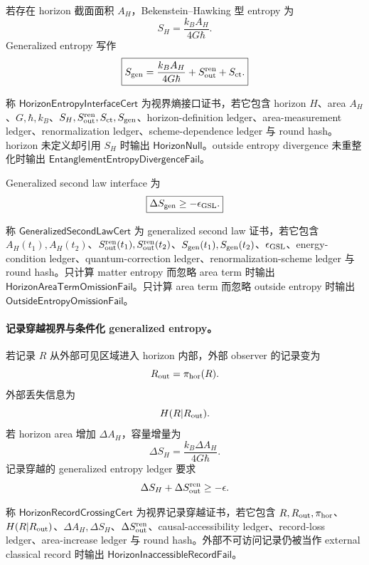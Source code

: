 若存在 horizon 截面面积 \(A_H\)，Bekenstein--Hawking 型 entropy 为
\[
\boxed{
S_H=\frac{k_BA_H}{4G\hbar}.
}
\]
Generalized entropy 写作
\[
\boxed{
S_{\rm gen}
=
\frac{k_BA_H}{4G\hbar}
+S_{\rm out}^{\rm ren}
+S_{\rm ct}.
}
\]

\begin{definition}[视界熵接口证书]\label{def:typed-address-biaxial-completion-horizon-entropy-interface-cert}
称 \(\mathsf{HorizonEntropyInterfaceCert}\) 为视界熵接口证书，若它包含 horizon \(H\)、area \(A_H\)、\(G,\hbar,k_B\)、\(S_H,S_{\rm out}^{\rm ren},S_{\rm ct},S_{\rm gen}\)、horizon-definition ledger、area-measurement ledger、renormalization ledger、scheme-dependence ledger 与 round hash。horizon 未定义却引用 \(S_H\) 时输出 \(\mathsf{HorizonNull}\)。outside entropy divergence 未重整化时输出 \(\mathsf{EntanglementEntropyDivergenceFail}\)。
\end{definition}

Generalized second law interface 为
\[
\boxed{
\Delta S_{\rm gen}\ge-\epsilon_{\rm GSL}.
}
\]

\begin{definition}\label{def:typed-address-biaxial-completion-generalized-second-law-cert}
称 \(\mathsf{GeneralizedSecondLawCert}\) 为 generalized second law 证书，若它包含 \(A_H(t_1),A_H(t_2)\)、\(S_{\rm out}^{\rm ren}(t_1),S_{\rm out}^{\rm ren}(t_2)\)、\(S_{\rm gen}(t_1),S_{\rm gen}(t_2)\)、\(\epsilon_{\rm GSL}\)、energy-condition ledger、quantum-correction ledger、renormalization-scheme ledger 与 round hash。只计算 matter entropy 而忽略 area term 时输出 \(\mathsf{HorizonAreaTermOmissionFail}\)。只计算 area term 而忽略 outside entropy 时输出 \(\mathsf{OutsideEntropyOmissionFail}\)。
\end{definition}

\paragraph{记录穿越视界与条件化 generalized entropy。}
若记录 \(R\) 从外部可见区域进入 horizon 内部，外部 observer 的记录变为
\[
R_{\rm out}=\pi_{\rm hor}(R).
\]
外部丢失信息为
\[
H(R|R_{\rm out}).
\]
若 horizon area 增加 \(\Delta A_H\)，容量增量为
\[
\Delta S_H=\frac{k_B\Delta A_H}{4G\hbar}.
\]
记录穿越的 generalized entropy ledger 要求
\[
\Delta S_H+\Delta S_{\rm out}^{\rm ren}\ge-\epsilon.
\]

\begin{definition}[视界记录穿越证书]\label{def:typed-address-biaxial-completion-horizon-record-crossing-cert}
称 \(\mathsf{HorizonRecordCrossingCert}\) 为视界记录穿越证书，若它包含 \(R,R_{\rm out},\pi_{\rm hor}\)、\(H(R|R_{\rm out})\)、\(\Delta A_H,\Delta S_H\)、\(\Delta S_{\rm out}^{\rm ren}\)、causal-accessibility ledger、record-loss ledger、area-increase ledger 与 round hash。外部不可访问记录仍被当作 external classical record 时输出 \(\mathsf{HorizonInaccessibleRecordFail}\)。
\end{definition}

